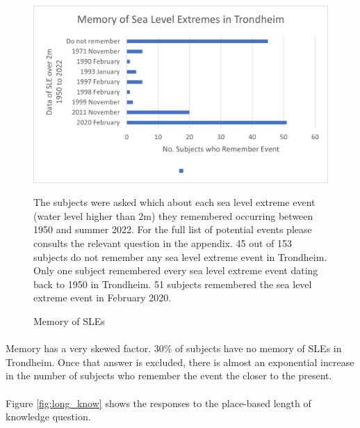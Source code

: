 \begin{figure}[H]
    \centering
    \includegraphics{fig_results/memory-sle.png}
    \caption{Memory of SLEs}{ The subjects were asked which about each sea level extreme event (water level higher than 2m) they remembered occurring between 1950 and summer 2022. For the full list of potential events please consults the relevant question in the appendix. 45 out of 153 subjects do not remember any sea level extreme event in Trondheim. Only one subject remembered every sea level extreme event dating back to 1950 in Trondheim. 51 subjects remembered the sea level extreme event in February 2020. }
    \label{fig:memory_sle}
\end{figure}
\paragraph{}

Memory has a very skewed factor. 30\% of subjects have no memory of SLEs in Trondheim. Once that answer is excluded, there is almost an exponential increase in the number of subjects who remember the event the closer to the present. 
\paragraph{}
Figure \ref{fig:long_know} shows the responses to the place-based length of knowledge question.

